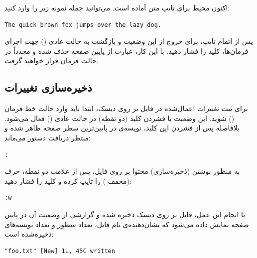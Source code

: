 اکنون محیط برای تایپ متن آماده است. می‌توانید جمله نمونه زیر را وارد کنید:

\begin{latin}
\begin{lstlisting}
The quick brown fox jumps over the lazy dog.
\end{lstlisting}
\end{latin}

پس از اتمام تایپ، برای خروج از این وضعیت و بازگشت به حالت عادی () جهت اجرای فرمان‌ها، کلید  را فشار دهید. با این کار، عبارت  از پایین صفحه حذف شده و مجدداً در حالت فرمان قرار خواهید گرفت.

\subsection{ذخیره‌سازی تغییرات}

برای ثبت تغییرات اعمال‌شده در فایل بر روی دیسک، ابتدا باید وارد حالت خط فرمان () شوید. این وضعیت با فشردن کلید \cmd{:} (دو نقطه) در حالت عادی () فعال می‌شود. بلافاصله پس از فشردن این کلید، نویسه‌ی \cmd{:} در پایین‌ترین سطر صفحه ظاهر شده و منتظر دریافت دستور می‌ماند:

\begin{latin}
\begin{lstlisting}
:
\end{lstlisting}
\end{latin}

به منظور نوشتن (ذخیره‌سازی) محتوا بر روی فایل، پس از علامت دو نقطه، حرف  (مخفف ) را تایپ کرده و کلید  را فشار دهید:

\begin{latin}
\begin{lstlisting}
:w
\end{lstlisting}
\end{latin}

با انجام این عمل، فایل بر روی دیسک ذخیره شده و گزارشی از وضعیت آن در پایین صفحه نمایش داده می‌شود که نشان‌دهنده‌ی نام فایل، تعداد سطور و تعداد نویسه‌های ذخیره‌شده است:

\begin{latin}
\begin{lstlisting}
"foo.txt" [New] 1L, 45C written
\end{lstlisting}
\end{latin}

